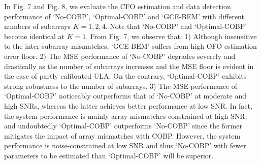 \documentclass[12pt, draftclsnofoot, onecolumn]{IEEEtran}
\begin{document}
In Fig. 7 and Fig. 8, we evaluate the CFO estimation and data detection performance of `No-COBP', `Optimal-COBP' and `GCE-BEM' with different numbers of subarrays $K=1, 2, 4$. Note that `No-COBP' and `Optimal-COBP' become identical at $K=1$.
From Fig. 7, we observe that:
1) Although insensitive to the inter-subarray mismatches, `GCE-BEM' suffers from high OFO estimation error floor.
2) The MSE performance of `No-COBP' degrades severely and drastically as the number of subarrays increases and the MSE floor is evident in the case of partly calibrated ULA. On the contrary, `Optimal-COBP' exhibits strong robustness to the number of subarrays.
3) The MSE performance of `Optimal-COBP' noticeably outperforms that of `No-COBP' at moderate and high SNRs, whereas the latter achieves better performance at low SNR. In fact, the system performance is mainly array mismatches-constrained at high SNR, and undoubtedly `Optimal-COBP' outperforms `No-COBP' since the former mitigates the impact of array mismatches with COBP. However, the system performance is noise-constrained at low SNR and thus `No-COBP' with fewer parameters to be estimated than `Optimal-COBP' will be superior.
\end{document}
